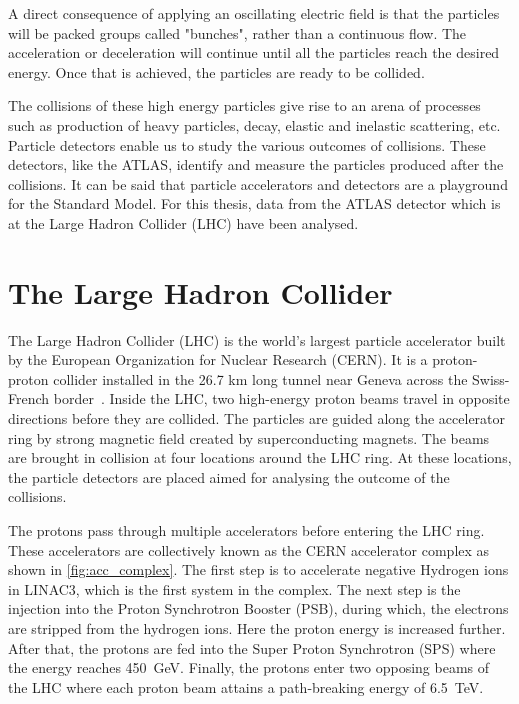 A direct consequence of applying an oscillating electric field is that the particles will be packed 
groups called "bunches", rather than a continuous flow. The acceleration or deceleration
will continue until all the particles reach the desired energy. Once that is achieved, the particles
are ready to be collided.

The collisions of these high energy particles give rise to an arena of processes such as production 
of heavy particles, decay, elastic and inelastic scattering, etc. Particle detectors enable us to study
the various outcomes of collisions. These detectors, like the ATLAS, identify and measure the 
particles produced after the collisions. It can be said that particle accelerators and detectors are a 
playground for the Standard Model. For this thesis, data from the ATLAS detector which is at the 
Large Hadron Collider (LHC) have been analysed. 



\section{The Large Hadron Collider}
\label{sec:LHC}
The Large Hadron Collider (LHC) is the world's largest particle accelerator built by the 
European Organization for Nuclear Research (CERN). It is a proton-proton collider 
installed in the 26.7 km long tunnel near Geneva across the Swiss-French border~\cite{Evans:2008zzb}. 
Inside the LHC, two high-energy proton beams travel in opposite directions before they are collided.
The particles are guided along the accelerator ring by strong magnetic field created by superconducting
magnets. The beams are brought in collision at four locations around the LHC ring. At these locations, 
the particle detectors are placed aimed for analysing the outcome of the collisions.

The protons pass through multiple accelerators before entering the LHC ring. These accelerators are
collectively known as the CERN accelerator complex as shown in \cref{fig:acc_complex}. The first step 
is to accelerate negative Hydrogen ions in LINAC3, which is the first system in the
complex. The next step is the injection into the Proton Synchrotron Booster (PSB), during which, 
the electrons are stripped from the hydrogen ions. Here the proton energy is increased further. After 
that, the protons are fed into the Super Proton Synchrotron (SPS) where the energy reaches \qty{450}{\GeV}. 
Finally, the protons enter two opposing beams of the LHC where each proton beam attains a 
path-breaking energy of \qty{6.5}{\TeV}. 

